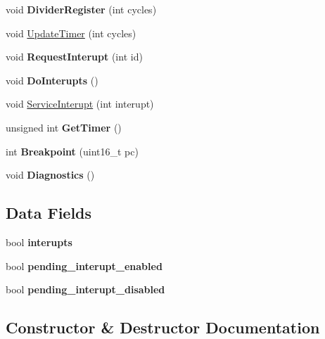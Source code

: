 \begin{DoxyCompactItemize}
void {\bfseries Divider\+Register} (int cycles)
\item 
void \mbox{\hyperlink{classCPU_ad8eb59dff5e4fe4c1b2881cc67574ddf}{Update\+Timer}} (int cycles)
\item 
\mbox{\label{classCPU_ad65b0c4a4b9db9d040ddd22f8eb0bd08}} 
void {\bfseries Request\+Interupt} (int id)
\item 
\mbox{\label{classCPU_a65a4b697968c6a46b673f32a7817d757}} 
void {\bfseries Do\+Interupts} ()
\item 
void \mbox{\hyperlink{classCPU_ab932fc0e9d81733f90e878d644991e2e}{Service\+Interupt}} (int interupt)
\item 
\mbox{\label{classCPU_a61fc2fe8c3cdbb6a5628ae5a1bfe3fa2}} 
unsigned int {\bfseries Get\+Timer} ()
\item 
\mbox{\label{classCPU_af4808063d0a0951498356c5fe2acd658}} 
int {\bfseries Breakpoint} (uint16\+\_\+t pc)
\item 
\mbox{\label{classCPU_a4a20f8c57aaec340f263170d28c4e1cd}} 
void {\bfseries Diagnostics} ()
\end{DoxyCompactItemize}
\subsection*{Data Fields}
\begin{DoxyCompactItemize}
\item 
\mbox{\label{classCPU_a797905d25211f84cb8b21bd1ddb0d5f2}} 
bool {\bfseries interupts}
\item 
\mbox{\label{classCPU_a47fbbb6dd480628b4a70229b60780426}} 
bool {\bfseries pending\+\_\+interupt\+\_\+enabled}
\item 
\mbox{\label{classCPU_ac51eaed220b85ec31587946bcbea6c48}} 
bool {\bfseries pending\+\_\+interupt\+\_\+disabled}
\end{DoxyCompactItemize}


\subsection{Constructor \& Destructor Documentation}
\mbox{\label{classCPU_a398bb4352a0dbaa9b2010f2084d9f8f7}} 
